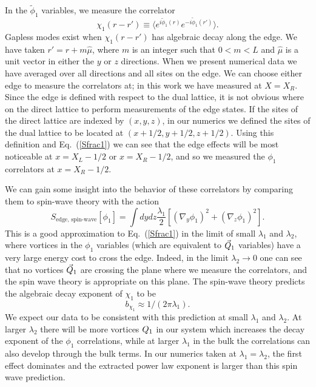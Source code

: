 In the $\tilde{\phi}_1$ variables, we measure the correlator
\begin{equation}
\chi_1(r-r')\equiv\langle e^{i\tilde{\phi}_1(r)}e^{-i\tilde{\phi}_1(r')}\rangle.
\label{Crr2}
\end{equation}
Gapless modes exist when $\chi_1(r-r')$ has algebraic decay along the edge. We have taken $r'=r+m\hat{\mu}$, where $m$ is an integer such that $0<m<L$ and $\hat{\mu}$ is a unit vector in either the $y$ or $z$ directions. When we present numerical data we have averaged over all directions and all sites on the edge. We can choose either edge to measure the correlators at; in this work we have measured at $X=X_R$.  Since the edge is defined with respect to the dual lattice, it is not obvious where on the direct lattice to perform measurements of the edge states.  If the sites of the direct lattice are indexed by $(x,y,z)$, in our numerics we defined the sites of the dual lattice to be located at $(x+1/2,y+1/2,z+1/2)$. Using this definition and Eq.~(\ref{Sfrac1}) we can see that the edge effects will be most noticeable at $x=X_L-1/2$ or $x=X_R-1/2$, and so we measured the $\phi_1$ correlators at $x=X_R-1/2$. 

We can gain some insight into the behavior of these correlators by comparing them to spin-wave theory with the action
\begin{equation*}
S_{\text{edge, spin-wave}}[\phi_1]=\int dydz \frac{\lambda_1}{2}\left[ (\nabla_y \phi_1)^2+(\nabla_z \phi_1)^2 \right].
\end{equation*}
This is a good approximation to Eq.~(\ref{Sfrac1}) in the limit of small $\lambda_1$ and $\lambda_2$, where vortices in the $\phi_1$ variables (which are equivalent to $\vec{Q}_1$ variables) have a very large energy cost to cross the edge. Indeed, in the limit $\lambda_2\rightarrow0$ one can see that no vortices $\vec{Q}_1$ are crossing the plane where we measure the correlators, and the spin wave theory is appropriate on this plane. The spin-wave theory predicts the algebraic decay exponent of $\chi_1$ to be 
\begin{equation}
b_{\chi_1} \approx 1/(2\pi\lambda_1).
\label{bchi1_sw}
\end{equation}
We expect our data to be consistent with this prediction at small $\lambda_1$ and $\lambda_2$. At larger $\lambda_2$ there will be more vortices $Q_1$ in our system which increases the decay exponent of the $\phi_1$ correlations, while at larger $\lambda_1$ in the bulk the correlations can also develop through the bulk terms. In our numerics taken at $\lambda_1 = \lambda_2$, the first effect dominates and the extracted power law exponent is larger than this spin wave prediction.

